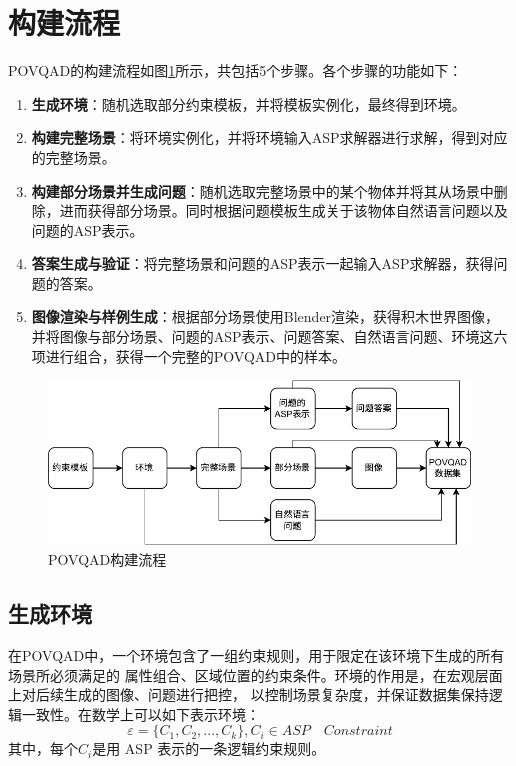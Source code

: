 \section{构建流程}
POVQAD的构建流程如图\ref{fig:dataset-generation}所示，共包括5个步骤。各个步骤的功能如下：
\begin{enumerate}[nosep]
\item \textbf{生成环境}：随机选取部分约束模板，并将模板实例化，最终得到环境。
\item \textbf{构建完整场景}：将环境实例化，并将环境输入ASP求解器进行求解，得到对应的完整场景。
\item \textbf{构建部分场景并生成问题}：随机选取完整场景中的某个物体并将其从场景中删除，进而获得部分场景。同时根据问题模板生成关于该物体自然语言问题以及问题的ASP表示。
\item \textbf{答案生成与验证}：将完整场景和问题的ASP表示一起输入ASP求解器，获得问题的答案。
\item \textbf{图像渲染与样例生成}：根据部分场景使用Blender渲染，获得积木世界图像，并将图像与部分场景、问题的ASP表示、问题答案、自然语言问题、环境这六项进行组合，获得一个完整的POVQAD中的样本。
\end{enumerate}
\begin{figure}[h]
\centering
\includegraphics{figures/pipeline-POVQAD.drawio-crop.pdf}
\caption{POVQAD构建流程}
\label{fig:dataset-generation}
\end{figure}

\subsection{生成环境}
在POVQAD中，一个环境包含了一组约束规则，用于限定在该环境下生成的所有场景所必须满足的
属性组合、区域位置的约束条件。环境的作用是，在宏观层面上对后续生成的图像、问题进行把控，
以控制场景复杂度，并保证数据集保持逻辑一致性。在数学上可以如下表示环境：
$$ \varepsilon = \{C_1,C_2, ..., C_k \}, C_i \in ASP \quad Constraint $$
其中，每个$C_i$是用 ASP 表示的一条逻辑约束规则。

